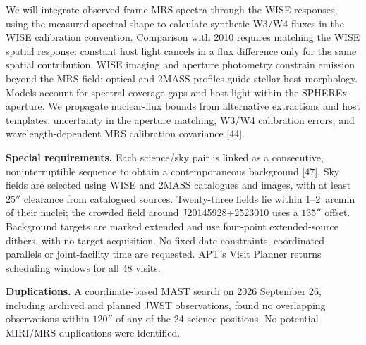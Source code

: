 \documentclass[12pt]{article}
\begin{document}
We will integrate observed-frame MRS spectra through the WISE responses, using the measured spectral shape to calculate synthetic W3/W4 fluxes in the WISE calibration convention. Comparison with 2010 requires matching the WISE spatial response: constant host light cancels in a flux difference only for the same spatial contribution. WISE imaging and aperture photometry constrain emission beyond the MRS field; optical and 2MASS profiles guide stellar-host morphology. Models account for spectral coverage gaps and host light within the SPHEREx aperture. We propagate nuclear-flux bounds from alternative extractions and host templates, uncertainty in the aperture matching, W3/W4 calibration errors, and wavelength-dependent MRS calibration covariance [44].

\clearpage
\supplementalinformation
\noindent\textbf{Special requirements.} Each science/sky pair is linked as a consecutive, noninterruptible sequence to obtain a contemporaneous background [47]. Sky fields are selected using WISE and 2MASS catalogues and images, with at least $25''$ clearance from catalogued sources. Twenty-three fields lie within 1--2~arcmin of their nuclei; the crowded field around J20145928+2523010 uses a $135''$ offset. Background targets are marked extended and use four-point extended-source dithers, with no target acquisition. No fixed-date constraints, coordinated parallels or joint-facility time are requested. APT's Visit Planner returns scheduling windows for all 48 visits.

\noindent\textbf{Duplications.} A coordinate-based MAST search on 2026 September 26, including archived and planned JWST observations, found no overlapping observations within $120''$ of any of the 24 science positions. No potential MIRI/MRS duplications were identified.
\end{document}
